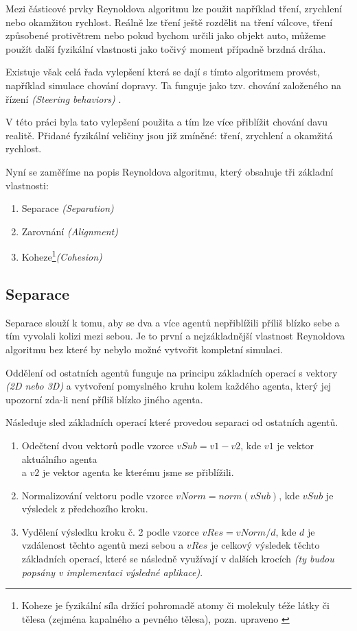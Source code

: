 \documentclass[czech,public,dept460,male,cpdeclaration]{diploma}
\begin{document}
Mezi částicové prvky Reynoldova algoritmu lze použit například tření, zrychlení nebo okamžitou rychlost. Reálně lze tření ještě rozdělit na tření válcove, tření způsobené protivětrem nebo pokud bychom určili jako objekt auto, můžeme použít další fyzikální vlastnosti jako točivý moment případně brzdná dráha.

Existuje však celá řada vylepšení která se dají s tímto algoritmem provést, například simulace chování dopravy. Ta funguje jako tzv. chování založeného na řízení \textit{(Steering behaviors)} \cite{linkToSteeringBehaviors}. 

V této práci byla tato vylepšení použita a tím lze více přiblížit chování davu realitě. Přidané fyzikální veličiny jsou již zmíněné: tření, zrychlení a okamžitá rychlost.

\newpage
Nyní se zaměříme na popis Reynoldova algoritmu, který obsahuje tři základní vlastnosti:

\begin{enumerate}
	\item Separace \textit{(Separation)}
	\item Zarovnání \textit{(Alignment)}
	\item Koheze\footnote{Koheze je fyzikální síla držící pohromadě atomy či molekuly téže látky či tělesa (zejména
		kapalného a pevného tělesa), pozn. upraveno \cite{linkToCohesion}}\textit{(Cohesion)}
\end{enumerate}

\subsection{Separace}\label{sec:separace}
Separace slouží k tomu, aby se dva a více agentů nepřiblížili příliš blízko sebe a tím vyvolali kolizi mezi sebou. Je to první a nejzákladnější vlastnost Reynoldova algoritmu bez které by nebylo možné vytvořit kompletní simulaci. 

Oddělení od ostatních agentů funguje na principu základních operací s vektory \textit{(2D nebo 3D)} a vytvoření pomyslného kruhu kolem každého agenta, který jej upozorní zda-li není příliš blízko jiného agenta. 

Následuje sled základních operací které provedou separaci od ostatních agentů. 

\begin{enumerate}
	\item Odečtení dvou vektorů podle vzorce \(vSub = v1 - v2\), kde \(v1\) je vektor aktuálního agenta\\ a \(v2\) je vektor agenta ke kterému jsme se přiblížili.
	\item Normalizování vektoru podle vzorce \(vNorm = norm(vSub)\), kde \(vSub\) je výsledek z předchozího kroku.
	\item Vydělení výsledku kroku č. 2 podle vzorce \(vRes = vNorm / d\), kde \(d\) je vzdálenost těchto agentů mezi sebou a \(vRes\) je celkový výsledek těchto základních operací, které se následně využívají v dalších krocích \textit{(ty budou popsány v implementaci výsledné aplikace)}.
\end{enumerate}
\end{document}
